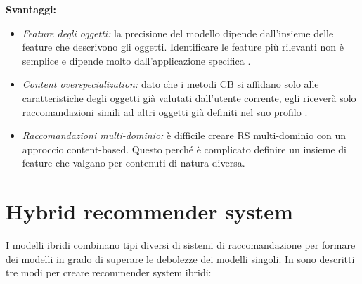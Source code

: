 \noindent \textbf{Svantaggi:}
\begin{itemize}
 \item \textit{Feature degli oggetti:} la precisione del modello dipende dall'insieme delle feature che descrivono gli oggetti. Identificare le feature più rilevanti non è semplice e dipende molto dall'applicazione specifica \cite{survey-mattia}.
 
 \item \textit{Content overspecialization:} dato che i metodi CB si affidano solo alle caratteristiche degli oggetti già valutati dall'utente corrente, egli riceverà solo raccomandazioni simili ad altri oggetti già definiti nel suo profilo \cite{recsys-principle-methods-evaluation}.
 
 \item \textit{Raccomandazioni multi-dominio:} è difficile creare RS multi-dominio con un approccio content-based. Questo perché è complicato definire un insieme di feature che valgano per contenuti di natura diversa.
\end{itemize}

\section{Hybrid recommender system}
I modelli ibridi combinano tipi diversi di sistemi di raccomandazione per formare dei modelli in grado di superare le debolezze dei modelli singoli. In \cite{recsys-book} sono descritti tre modi per creare recommender system ibridi:

